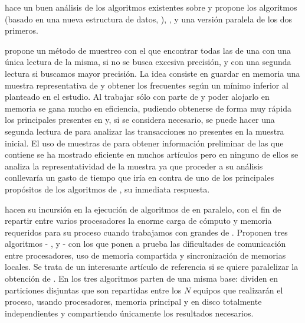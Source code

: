 \citet{Mueller-FastSequentialAndParallelAlgorithmsForARM-1995} hace un buen análisis de los algoritmos existentes sobre \ARM y propone los algoritmos  (basado en una nueva estructura de datos, ), ,  y una versión paralela de los dos primeros.



\citet{Toivonen-SamplingLargeDatabasesForAssociationRules-1996} propone un método de muestreo con el que encontrar todas las \ars de una \db con una única lectura de la misma, si no se busca excesiva precisión, y con una segunda lectura si buscamos mayor precisión. La idea consiste en guardar en memoria una muestra representativa de \D y obtener los \itemsets frecuentes según un \soporte mínimo inferior al planteado en el estudio. Al trabajar sólo con parte de \D y poder alojarlo en memoria se gana mucho en eficiencia, pudiendo obtenerse de forma muy rápida los principales \patrones presentes en \D y, si se considera necesario, se puede hacer una segunda lectura de \D para analizar las transacciones no presentes en la muestra inicial. El uso de muestras de \D para obtener información preliminar de las \ars que contiene se ha mostrado eficiente en muchos artículos pero en ninguno de ellos se analiza la representatividad de la muestra ya que proceder a su análisis conllevaría un gasto de tiempo que iría en contra de uno de los principales propósitos de los algoritmos de \ARM, su inmediata respuesta.


\citet{AgrawalShafer-ParallelMAR-1996} hacen su incursión en la ejecución de algoritmos de \ARM en paralelo, con el fin de repartir entre varios procesadores la enorme carga de cómputo y memoria requeridos para su proceso cuando trabajamos con grandes \dbs de \transacciones. Proponen tres algoritmos - ,  y  - con los que ponen a prueba las dificultades de comunicación entre procesadores, uso de memoria compartida y sincronización de memorias locales. Se trata de un interesante artículo de referencia si se quiere paralelizar la obtención de \ars. En los tres algoritmos parten de una misma base: dividen \D en particiones disjuntas que son repartidas entre los $N$ equipos que realizarán el proceso, usando procesadores, memoria principal y en disco totalmente independientes y compartiendo únicamente los resultados necesarios. 

